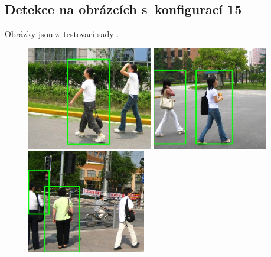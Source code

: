 \subsection*{Detekce na obrázcích s~konfigurací 15}
Obrázky jsou z~testovací sady \cite{testimg}.
\label{appFigure}
\begin{figure}[H]
\centering
\includegraphics[keepaspectratio, max height=4.5cm,]{figures/ped/d/1}%
\hfill %
\includegraphics[keepaspectratio, max height=4.5cm,]{figures/ped/d/2}%
\hfill %
\includegraphics[keepaspectratio, max height=4.5cm,]{figures/ped/d/3}%
\end{figure}


